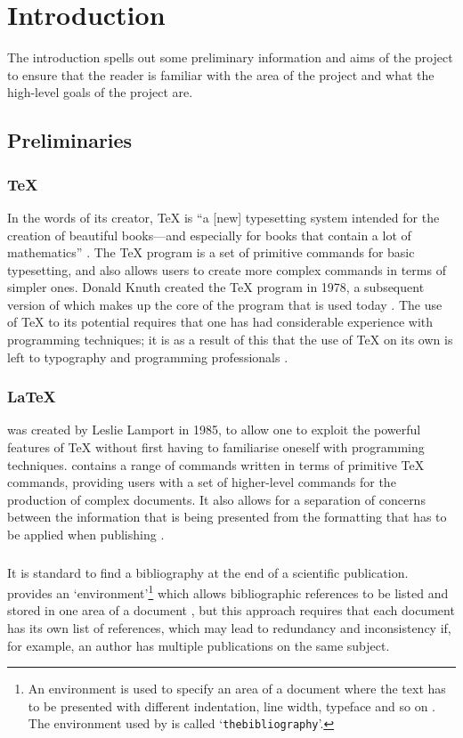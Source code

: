 \chapter{Introduction}
\label{intro}
The introduction spells out some preliminary information and aims of the project to ensure that the reader is familiar with the area of the project and what the high-level goals of the project are.

\section{Preliminaries}
\subsection{\TeX{}}
In the words of its creator, \TeX{} is ``a [new] typesetting system intended for the creation of beautiful books---and especially for books that contain a lot of mathematics'' \cite{DK84}.  The \TeX{} program is a set of primitive commands for basic typesetting, and also allows users to create more complex commands in terms of simpler ones.  Donald Knuth created the \TeX{} program in 1978, a subsequent version of which makes up the core of the program that is used today \cite{TeXOrigin}.  The use of \TeX{} to its potential requires that one has had considerable experience with programming techniques; it is as a result of this that the use of \TeX{} on its own is left to typography and programming professionals \cite{KD95}.

\subsection{\LaTeX}
\latex was created by Leslie Lamport in 1985, to allow one to exploit the powerful features of \TeX{} without first having to familiarise oneself with programming techniques. \latex contains a range of commands written in terms of primitive \TeX{} commands, providing users with a set of higher-level commands for the production of complex documents.  It also allows for a separation of concerns between the information that is being presented from the formatting that has to be applied when publishing \cite{KD95}.

\subsection{\bibtex}
It is standard to find a bibliography at the end of a scientific publication. \latex provides an `environment'\footnote{An environment is used to specify an area of a document where the text has to be presented with different indentation, line width, typeface and so on \cite{KD95}.  The environment used by \latex is called `\texttt{thebibliography}'.} which allows bibliographic references to be listed and stored in one area of a document \cite{KD95}, but this approach requires that each document has its own list of references, which may lead to redundancy and inconsistency if, for example, an author has multiple publications on the same subject. 

